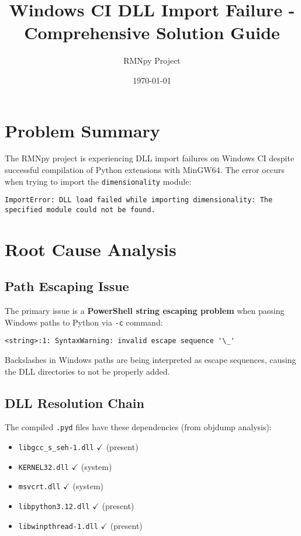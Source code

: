 \documentclass[11pt]{article}
\title{Windows CI DLL Import Failure - Comprehensive Solution Guide}
\author{RMNpy Project}
\date{\today}
\begin{document}
\maketitle

\section{Problem Summary}

The RMNpy project is experiencing DLL import failures on Windows CI despite successful compilation of Python extensions with MinGW64. The error occurs when trying to import the \texttt{dimensionality} module:

\begin{lstlisting}
ImportError: DLL load failed while importing dimensionality: The specified module could not be found.
\end{lstlisting}

\section{Root Cause Analysis}

\subsection{Path Escaping Issue}
The primary issue is a \textbf{PowerShell string escaping problem} when passing Windows paths to Python via \texttt{-c} command:

\begin{lstlisting}
<string>:1: SyntaxWarning: invalid escape sequence '\_'
\end{lstlisting}

Backslashes in Windows paths are being interpreted as escape sequences, causing the DLL directories to not be properly added.

\subsection{DLL Resolution Chain}
The compiled \texttt{.pyd} files have these dependencies (from objdump analysis):
\begin{itemize}
   \item \texttt{libgcc\_s\_seh-1.dll} $\checkmark$ (present)
   \item \texttt{KERNEL32.dll} $\checkmark$ (system)
   \item \texttt{msvcrt.dll} $\checkmark$ (system)
   \item \texttt{libpython3.12.dll} $\checkmark$ (present)
   \item \texttt{libwinpthread-1.dll} $\checkmark$ (present)
\end{itemize}
\end{document}
